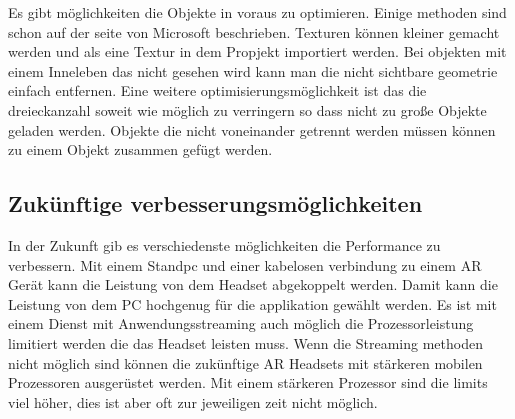 Es gibt möglichkeiten die Objekte in voraus zu optimieren.
Einige methoden sind schon auf der seite von Microsoft \autocite{best_practices} beschrieben.
Texturen können kleiner gemacht werden und als eine Textur in dem Propjekt importiert werden.
Bei objekten mit einem Inneleben das nicht gesehen wird kann man die nicht sichtbare geometrie einfach entfernen.
Eine weitere optimisierungsmöglichkeit ist das die dreieckanzahl soweit wie möglich zu verringern so dass nicht zu große Objekte geladen werden.
Objekte die nicht voneinander getrennt werden müssen können zu einem Objekt zusammen gefügt werden.


\subsection{Zukünftige verbesserungsmöglichkeiten}\label{subsec:Zukünftige verbesserungsmöglichkeiten}

In der Zukunft gib es verschiedenste möglichkeiten die Performance zu verbessern.
Mit einem Standpc und einer kabelosen verbindung zu einem AR Gerät kann die Leistung von dem Headset abgekoppelt werden. 
Damit kann die Leistung von dem PC hochgenug für die applikation gewählt werden.
Es ist mit einem Dienst mit Anwendungsstreaming auch möglich die Prozessorleistung limitiert werden die das Headset leisten muss.
Wenn die Streaming methoden nicht möglich sind können die zukünftige AR Headsets mit stärkeren mobilen Prozessoren ausgerüstet werden. Mit einem stärkeren Prozessor sind die limits viel höher, dies ist aber oft zur jeweiligen zeit nicht möglich.

